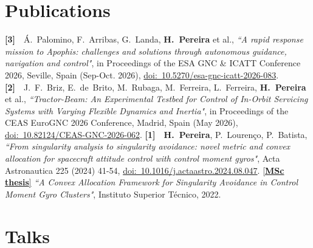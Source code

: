 \documentclass[a4paper,12pt]{article}
\begin{document}
\section{Publications}

\noindent
\textbf{[3]}~~Á.~Palomino, F.~Arribas, G.~Landa, \textbf{H.~Pereira} et al., \textit{``A rapid response mission to Apophis: challenges and solutions through autonomous guidance, navigation and control"}, in Proceedings of the ESA GNC \& ICATT Conference 2026, Seville, Spain (Sep-Oct. 2026), \href{https://www.researchgate.net/publication/416769451_A_rapid_response_mission_to_Apophis_challenges_and_solutions_through_autonomous_guidance_navigation_and_control}{doi:~10.5270/esa-gnc-icatt-2026-083}.
\vskip 6pt
\noindent
\textbf{[2]}~~J.~F.~Briz, E.~de~Brito, M.~Rubaga, M.~Ferreira, L.~Ferreira, \textbf{H.~Pereira} et al., \textit{``Tractor-Beam: An Experimental Testbed for Control of In-Orbit Servicing Systems with Varying Flexible Dynamics and Inertia"}, in Proceedings of the CEAS EuroGNC 2026 Conference, Madrid, Spain (May 2026), \href{https://eurognc.ceas.org/archive/EuroGNC2026/html/CEAS-GNC-2026-062.html}{doi:~10.82124/CEAS-GNC-2026-062}.
\vskip 6pt
\noindent
\textbf{[1]}~~\textbf{H.~Pereira}, P.~Lourenço, P.~Batista, \textit{``From singularity analysis to singularity avoidance: novel metric and convex allocation for spacecraft attitude control with control moment gyros"}, Acta Astronautica 225 (2024) 41-54, \href{https://doi.org/10.1016/j.actaastro.2024.08.047}{doi:~10.1016/j.actaastro.2024.08.047}.
\vskip 6pt
\noindent
\href{https://fenix.tecnico.ulisboa.pt/cursos/meaer21/dissertacao/846778572213772}{[\textbf{MSc thesis}]} \textit{``A Convex Allocation Framework for Singularity Avoidance in Control Moment Gyro Clusters"}, Instituto Superior Técnico, 2022.


\section{Talks}

\ItemListStart
{}
\ItemListEnd


\end{document}
